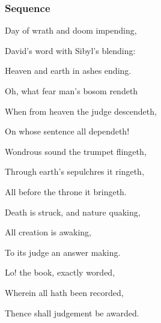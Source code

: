 
\subsubsection{Sequence}\label{diesirae}

\vspace{-0.5\baselineskip}

\begin{multicols}{2}
\begin{hangparas}{1.25em}{1}
Day of wrath and doom impending,\par
David's word with Sibyl's blending:\par
Heaven and earth in ashes ending.\\%
\par\noindent
Oh, what fear man's bosom rendeth\par\noindent
When from heaven the judge descendeth,\par\noindent
On whose sentence all dependeth!\\
\par\noindent
Wondrous sound the trumpet flingeth,\par\noindent
Through earth's sepulchres it ringeth,\par\noindent
All before the throne it bringeth.\\
\par\noindent
Death is struck, and nature quaking,\par\noindent
All creation is awaking,\par\noindent
To its judge an answer making.\\
\par\noindent
Lo! the book, exactly worded,\par\noindent
Wherein all hath been recorded,\par\noindent
Thence shall judgement be awarded.\\
\par\noindent

\end{hangparas}
\end{multicols}
